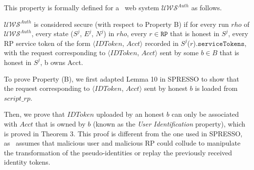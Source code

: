 


\vspace{3mm} This property is formally defined for a \usso\ web system $\mathcal{U\!W\!S}^{Auth}$ as follows. 

\begin{definition}
\label{def:B}
$\mathcal{U\!W\!S}^{Auth}$ is considered secure (with respect to Property B) if for every run $rho$ of $\mathcal{U\!W\!S}^{Auth}$, every state ($S^j$, $E^j$, $N^j$) in $rho$, every $r \in \mathtt{RP}$ that is honest in $S^j$, every RP service token of the form $\langle IDToken$, $Acct \rangle$ recorded in $S^j$($r$).$\mathtt{serviceTokens}$, with the request corresponding to $\langle IDToken$, $Acct \rangle$ sent by some $b \in B$ that is honest in $S^j$, b owns Acct.
\end{definition}

To prove Property (B), we first adapted Lemma 10 in SPRESSO to show that the request corresponding to $\langle IDToken$, $Acct \rangle$ sent by honest $b$ is loaded from $script\_rp$. 

Then, we prove that $IDToken$ uploaded by an honest $b$ can only be associated with $Acct$ that is owned by $b$ (known as the {\em User Identification} property), which is proved in Theorem 3. This proof is different from the one used in SPRESSO, as \usso\ assumes that malicious user and malicious RP could collude to manipulate the transformation of the pseudo-identities or replay the previously received identity tokens.



